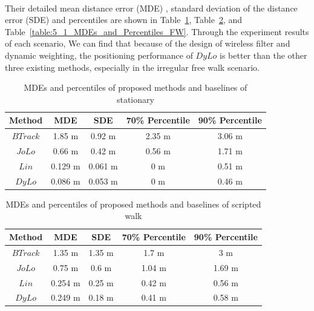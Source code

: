 \documentclass[a4paper,12pt]{report}
\begin{document}
\paragraph{}
Their detailed mean distance error (MDE) , standard deviation of the distance error (SDE) and percentiles are shown in Table~\ref{table:5_1_MDEs_and_Percentiles_ST}, Table~\ref{table:5_1_MDEs_and_Percentiles_SW}, and Table~\ref{table:5_1_MDEs_and_Percentiles_FW}. Through the experiment results of each scenario, We can find that because of the design of wireless filter and dynamic weighting, the positioning performance of $DyLo$ is better than the other three existing methods, especially in the irregular free walk scenario.

\begin{table}
    \begin{center}
    \caption{MDEs and percentiles of proposed methods and baselines of stationary}
    \label{table:5_1_MDEs_and_Percentiles_ST}
        \begin{tabular}{|c||c|c|c|c|}
            \hline
                Method & MDE & SDE & 70\% Percentile & 90\% Percentile \\
            \hline
            \hline
                $BTrack$ & 1.85 m  & 0.92 m  & 2.35 m & 3.06 m \\
            \hline
                $JoLo$   & 0.66 m  & 0.42 m  & 0.56 m & 1.71 m \\
            \hline
                $Lin$    & 0.129 m & 0.061 m & 0 m    & 0.51 m \\
            \hline
                $DyLo$   & 0.086 m & 0.053 m & 0 m    & 0.46 m \\
            \hline
        \end{tabular}
    \end{center}
\end{table}

\begin{table}
    \begin{center}
    \caption{MDEs and percentiles of proposed methods and baselines of scripted walk}
    \label{table:5_1_MDEs_and_Percentiles_SW}
        \begin{tabular}{|c||c|c|c|c|}
            \hline
                Method & MDE & SDE & 70\% Percentile & 90\% Percentile \\
            \hline
            \hline
                $BTrack$ & 1.35 m  & 1.35 m & 1.7 m  & 3 m \\
            \hline
                $JoLo$   & 0.75 m  & 0.6 m  & 1.04 m & 1.69 m \\
            \hline
                $Lin$    & 0.254 m & 0.25 m & 0.42 m & 0.56 m \\
            \hline
                $DyLo$   & 0.249 m & 0.18 m & 0.41 m & 0.58 m \\
            \hline
        \end{tabular}
    \end{center}
\end{table}
\end{document}
